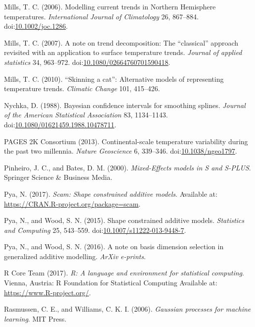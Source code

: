 \documentclass[12pt,]{article}
\begin{document}
\hypertarget{ref-Mills2006-rb}{}
Mills, T. C. (2006). Modelling current trends in Northern Hemisphere
temperatures. \emph{International Journal of Climatology} 26, 867--884.
doi:\href{https://doi.org/10.1002/joc.1286}{10.1002/joc.1286}.

\hypertarget{ref-Mills2007-pq}{}
Mills, T. C. (2007). A note on trend decomposition: The ``classical''
approach revisited with an application to surface temperature trends.
\emph{Journal of applied statistics} 34, 963--972.
doi:\href{https://doi.org/10.1080/02664760701590418}{10.1080/02664760701590418}.

\hypertarget{ref-Mills2010-oe}{}
Mills, T. C. (2010). ``Skinning a cat'': Alternative models of
representing temperature trends. \emph{Climatic Change} 101, 415--426.

\hypertarget{ref-Nychka1988-rz}{}
Nychka, D. (1988). Bayesian confidence intervals for smoothing splines.
\emph{Journal of the American Statistical Association} 83, 1134--1143.
doi:\href{https://doi.org/10.1080/01621459.1988.10478711}{10.1080/01621459.1988.10478711}.

\hypertarget{ref-PAGES_2k_Consortium2013-fm}{}
PAGES 2K Consortium (2013). Continental-scale temperature variability
during the past two millennia. \emph{Nature Geoscience} 6, 339--346.
doi:\href{https://doi.org/10.1038/ngeo1797}{10.1038/ngeo1797}.

\hypertarget{ref-Pinheiro2000-kx}{}
Pinheiro, J. C., and Bates, D. M. (2000). \emph{Mixed-Effects models in
S and S-PLUS}. Springer Science \& Business Media.

\hypertarget{ref-pya-scam-pkg}{}
Pya, N. (2017). \emph{Scam: Shape constrained additive models}.
Available at: \url{https://CRAN.R-project.org/package=scam}.

\hypertarget{ref-Pya2015-wr}{}
Pya, N., and Wood, S. N. (2015). Shape constrained additive models.
\emph{Statistics and Computing} 25, 543--559.
doi:\href{https://doi.org/10.1007/s11222-013-9448-7}{10.1007/s11222-013-9448-7}.

\hypertarget{ref-Pya2016-rk}{}
Pya, N., and Wood, S. N. (2016). A note on basis dimension selection in
generalized additive modelling. \emph{ArXiv e-prints}.

\hypertarget{ref-R-core-team}{}
R Core Team (2017). \emph{R: A language and environment for statistical
computing}. Vienna, Austria: R Foundation for Statistical Computing
Available at: \url{https://www.R-project.org/}.

\hypertarget{ref-Rasmussen2006-xk}{}
Rasmussen, C. E., and Williams, C. K. I. (2006). \emph{Gaussian
processes for machine learning}. MIT Press.
\end{document}
